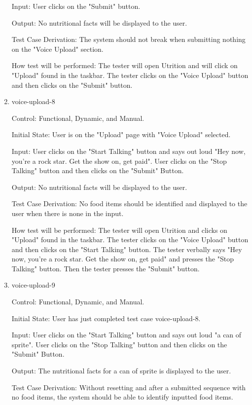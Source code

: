 \documentclass[12pt, titlepage]{article}
\begin{document}
\begin{enumerate}
	Input: User clicks on the "Submit" button.
	
	Output: No nutritional facts will be displayed to the user.
	
	Test Case Derivation: The system should not break when submitting nothing on the "Voice Upload" section.
	
	How test will be performed: The tester will open Utrition and will click on "Upload" found in the taskbar. The tester clicks on the "Voice Upload" button and then clicks on the "Submit" button.
	
	\item{voice-upload-8\\}
	
	Control: Functional, Dynamic, and Manual.
	
	Initial State: User is on the "Upload" page with "Voice Upload" selected.
	
	Input: User clicks on the "Start Talking" button and says out loud "Hey now, you're a rock star. Get the show on, get paid". User clicks on the "Stop Talking" button and then clicks on the "Submit" Button.
	
	Output: No nutritional facts will be displayed to the user.
	
	Test Case Derivation: No food items should be identified and displayed to the user when there is none in the input.
	
	How test will be performed: The tester will open Utrition and clicks on "Upload" found in the taskbar. The tester clicks on the "Voice Upload" button and then clicks on the "Start Talking" button. The tester verbally says "Hey now, you're a rock star. Get the show on, get paid" and presses the "Stop Talking" button. Then the tester presses the "Submit" button.
	
	\item{voice-upload-9\\}
	
	Control: Functional, Dynamic, and Manual.
	
	Initial State: User has just completed test case voice-upload-8.
	
	Input: User clicks on the "Start Talking" button and says out loud "a can of sprite". User clicks on the "Stop Talking" button and then clicks on the "Submit" Button.
	
	Output: The nutritional facts for a can of sprite is displayed to the user.
	
	Test Case Derivation: Without resetting and after a submitted sequence with no food items, the system should be able to identify inputted food items.
	

\end{enumerate}
\end{document}
